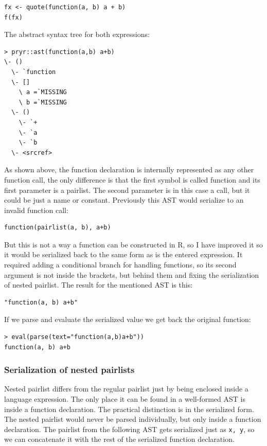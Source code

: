 \documentclass[thesis=B,english]{FITthesis}[2012/10/20]
\begin{document}
\begin{verbatim}
fx <- quote(function(a, b) a + b)
f(fx)
\end{verbatim}

The abstract syntax tree for both expressions:

\begin{verbatim}
> pryr::ast(function(a,b) a+b)
\- ()
  \- `function
  \- []
    \ a =`MISSING
    \ b =`MISSING
  \- ()
    \- `+
    \- `a
    \- `b
  \- <srcref> 
\end{verbatim}

As shown above, the function declaration is internally represented as any other function call, the only difference is that the first symbol is called function and its first parameter is a pairlist. The second parameter is in this case a call, but it could be just a name or constant. Previously this AST would serialize to an invalid function call:

\begin{verbatim}
function(pairlist(a, b), a+b)
\end{verbatim}

But this is not a way a function can be constructed in R, so I have improved it so it would be serialized back to the same form as is the entered expression. It required adding a conditional branch for handling functions, so its second argument is not inside the brackets, but behind them and fixing the serialization of nested pairlist. The result for the mentioned AST is this:

\begin{verbatim}
"function(a, b) a+b"
\end{verbatim}

If we parse and evaluate the serialized value we get back the original function:

\begin{verbatim}
> eval(parse(text="function(a,b)a+b"))
function(a, b) a+b
\end{verbatim}

\subsubsection{Serialization of nested pairlists}
Nested pairlist differs from the regular pairlist just by being enclosed inside a language expression. The only place it can be found in a well-formed AST is inside a function declaration. The practical distinction is in the serialized form. The nested pairlist would never be parsed individually, but only inside a function declaration. 
The pairlist from the following AST gets serialized just as \verb|x, y|, so we can concatenate it with the rest of the serialized function declaration.
\end{document}
